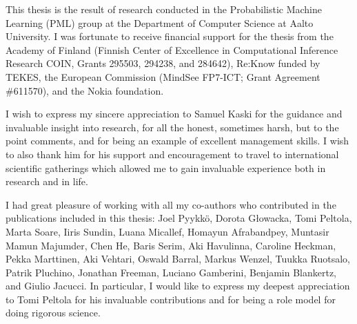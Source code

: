 \documentclass[dissertation,math,vertlayout,pdfa,colorlinks]{aaltoseries}
\begin{document}


 




\begin{preface}[Espoo]



This thesis is the result of research conducted in the Probabilistic Machine Learning (PML) group at the Department of Computer Science at Aalto University. I was fortunate to receive financial support for the thesis from the Academy of Finland (Finnish Center of Excellence in Computational Inference Research COIN, Grants 295503, 294238, and 284642), Re:Know funded by TEKES, the European Commission (MindSee FP7-ICT; Grant Agreement \#611570), and the Nokia foundation. 

I wish to express my sincere appreciation to Samuel Kaski for the guidance and invaluable insight into research, for all the honest, sometimes harsh, but to the point comments, and for being an example of excellent management skills. I wish to also thank him for his support and encouragement to travel to international scientific gatherings which allowed me to gain invaluable experience both in research and in life.

I had great pleasure of working with all my co-authors who contributed in the publications included in this thesis: Joel Pyykk\"o, Dorota G\l{}owacka, Tomi Peltola, Marta Soare, Iiris Sundin, Luana Micallef, Homayun Afrabandpey, Muntasir Mamun Majumder, Chen He, Baris Serim, Aki Havulinna, Caroline Heckman, Pekka Marttinen, Aki Vehtari, Oswald Barral, Markus Wenzel, Tuukka Ruotsalo, Patrik Pluchino, Jonathan Freeman, Luciano Gamberini, Benjamin Blankertz, and Giulio Jacucci. %
In particular, I would like to express my deepest appreciation to Tomi Peltola for his invaluable contributions and for being a role model for doing rigorous science. %


\end{preface}
\end{document}
